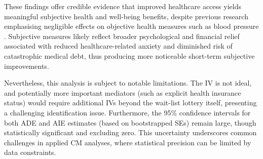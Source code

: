 These findings offer credible evidence that improved healthcare access yields meaningful subjective health and well-being benefits, despite previous research emphasising negligible effects on objective health measures such as blood pressure \citep{baicker2013oregon}.
Subjective measures likely reflect broader psychological and financial relief associated with reduced healthcare-related anxiety and diminished risk of catastrophic medical debt, thus producing more noticeable short-term subjective improvements.

Nevertheless, this analysis is subject to notable limitations.
The IV is not ideal, and potentially more important mediators (such as explicit health insurance status) would require additional IVs beyond the wait-list lottery itself, presenting a challenging identification issue.
Furthermore, the 95\% confidence intervals for both ADE and AIE estimates (based on bootstrapped SEs) remain large, though statistically significant and excluding zero.
This uncertainty underscores common challenges in applied CM analyses, where statistical precision can be limited by data constraints.
